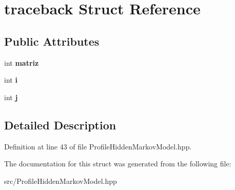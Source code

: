 \hypertarget{structtraceback}{}\section{traceback Struct Reference}
\label{structtraceback}
\subsection*{Public Attributes}
\begin{DoxyCompactItemize}
\item 
\mbox{\label{structtraceback_a19bf78498a22ce1c80974a6691521eaf}} 
int {\bfseries matriz}
\item 
\mbox{\label{structtraceback_a7b1c92b9b5b2547a291d4c4c748e6dc8}} 
int {\bfseries i}
\item 
\mbox{\label{structtraceback_a5caf37473fc223d2bd0c5a16064b8385}} 
int {\bfseries j}
\end{DoxyCompactItemize}


\subsection{Detailed Description}


Definition at line 43 of file Profile\+Hidden\+Markov\+Model.\+hpp.



The documentation for this struct was generated from the following file\+:\begin{DoxyCompactItemize}
\item 
src/Profile\+Hidden\+Markov\+Model.\+hpp\end{DoxyCompactItemize}
